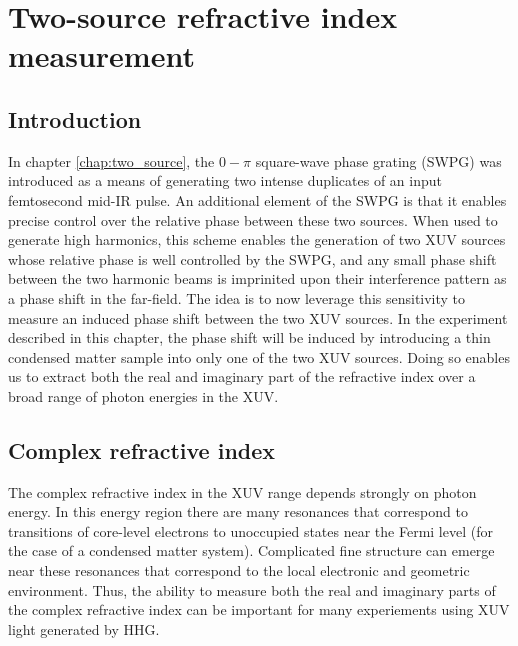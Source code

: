 \chapter{Two-source refractive index measurement}
\label{chap:refractive_index}

\section{Introduction}
\label{intro_ts}
In chapter \ref{chap:two_source}, the $0-\pi$ square-wave phase grating (SWPG) was introduced as a means of generating two intense duplicates of an input femtosecond mid-IR pulse.  An additional element of the SWPG is that it enables precise control over the relative phase between these two sources.  When used to generate high harmonics, this scheme enables the generation of two XUV sources whose relative phase is well controlled by the SWPG, and any small phase shift between the two harmonic beams is imprinited upon their interference pattern as a phase shift in the far-field.  The idea is to now leverage this sensitivity to measure an induced phase shift between the two XUV sources.  In the experiment described in this chapter, the phase shift will be induced by introducing a thin condensed matter sample into only one of the two XUV sources.  Doing so enables us to extract both the real and imaginary part of the refractive index over a broad range of photon energies in the XUV.
\section{Complex refractive index}
The complex refractive index in the XUV range depends strongly on photon energy. In this energy region there are many resonances that correspond to transitions of core-level electrons to unoccupied states near the Fermi level (for the case of a condensed matter system)\cite{stohrNEXAFSSpectroscopy1992}.  Complicated fine structure can emerge near these resonances that correspond to the local electronic and geometric environment\cite{stohrNEXAFSSpectroscopy1992}.  Thus, the ability to measure both the real and imaginary parts of the complex refractive index can be important for many experiements using XUV light generated by HHG\cite{kaplanFemtosecondTrackingCarrier2018,  cirriAchievingSurfaceSensitivity2017}.

